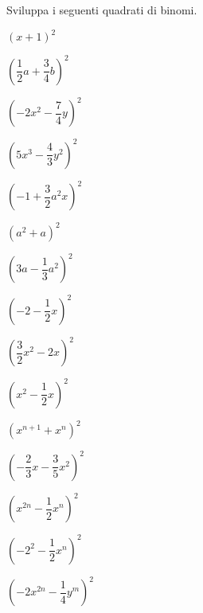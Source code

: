\begin{esercizio}
 \label{ese:11.6}
Sviluppa i seguenti quadrati di binomi.
\begin{multicols}{3}
\begin{enumeratea}
 \item $\left(x+1\right)^{2}$
 \item $\left(\dfrac{1}{2}a+\dfrac{3}{4}b\right)^{2}$
 \item $\left(-2x^{2}-\dfrac{7}{4}y\right)^{2}$
 \item $\left(5x^{3}-\dfrac{4}{3}y^{2}\right)^{2}$
 \item $\left(-1+\dfrac{3}{2}a^{2}x\right)^{2}$
 \item $\left(a^{2}+a\right)^{2}$
 \item $\left(3a-\dfrac{1}{3}a^{2}\right)^{2}$
 \item $\left(-2-\dfrac{1}{2}x\right)^{2}$
 \item $\left(\dfrac{3}{2}x^{2}-2x\right)^{2}$
 \item $\left(x^{2}-\dfrac{1}{2}x\right)^{2}$
 \item $\left(x^{n+1}+x^{n}\right)^{2}$
 \item $\left(-{\dfrac{2}{3}x-\dfrac{3}{5}x^{2}}\right)^{2}$
 \item $\left(x^{2n}-\dfrac{1}{2}x^{n}\right)^{2}$
 \item $\left(-2^{2}-\dfrac{1}{2}x^{n}\right)^{2}$
 \item $\left(-2x^{2n}-\dfrac{1}{4}y^{m}\right)^{2}$
\end{enumeratea}
\end{multicols}
\end{esercizio}

